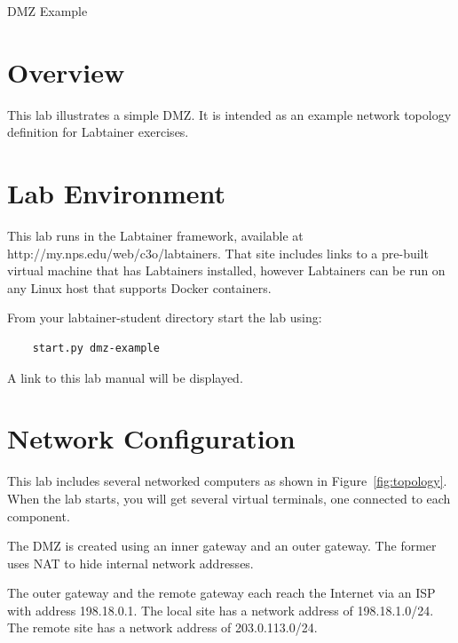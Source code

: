 


\begin{center}
{\LARGE DMZ Example}
\vspace{0.1in}\\
\end{center}

\copyrightnotice

\section{Overview}
This lab illustrates a simple DMZ.
It is intended as an example network topology definition for
Labtainer exercises.


\section{Lab Environment}
This lab runs in the Labtainer framework,
available at http://my.nps.edu/web/c3o/labtainers.
That site includes links to a pre-built virtual machine
that has Labtainers installed, however Labtainers can
be run on any Linux host that supports Docker containers.

From your labtainer-student directory start the lab using:
\begin{verbatim}
    start.py dmz-example
\end{verbatim}
\noindent A link to this lab manual will be displayed.  

\section{Network Configuration}
This lab includes several networked computers as shown in Figure~\ref{fig:topology}.
When the lab starts, you will get several virtual terminals, one connected to each
component.

The DMZ is created using an inner gateway and an outer gateway.  The former uses NAT to
hide internal network addresses.

The outer gateway and the remote gateway each reach the Internet via an ISP with 
address 198.18.0.1.  The local site has a network address of 198.18.1.0/24.  The remote
site has a network address of 203.0.113.0/24.

